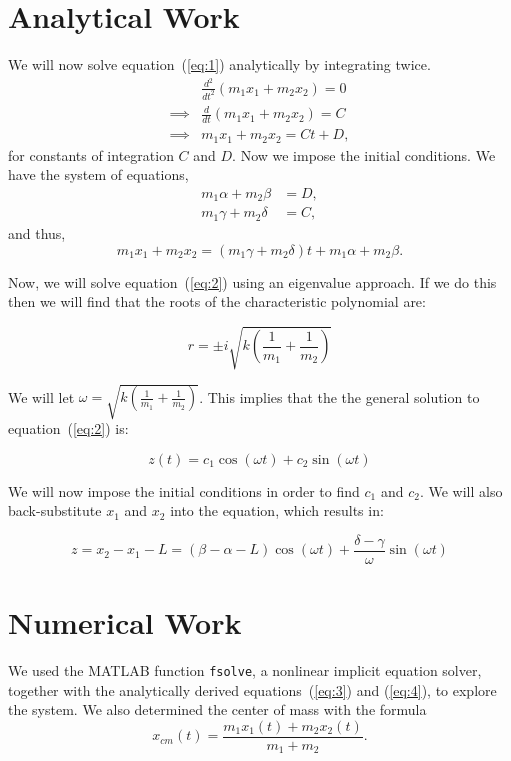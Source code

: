 \documentclass[11pt, oneside]{article}   	%
\begin{document}
\section{Analytical Work}
We will now solve equation~(\ref{eq:1})  analytically by integrating twice.
\begin{align*}
&\frac{d^2}{dt^2}(m_1x_1 + m_2x_2) = 0 \\
\implies & \frac{d}{dt}(m_1x_1 + m_2x_2) = C\\
\implies & m_1x_1 + m_2x_2 = Ct+D,
\end{align*}
for constants of integration $C$ and $D$. Now we impose the initial conditions.
We have the system of equations,
\begin{align*}
m_1\alpha + m_2\beta &= D, \\
m_1\gamma + m_2\delta &= C,
\end{align*}
and thus,
\begin{equation}
\label{eq:3}
m_1x_1 + m_2x_2 = (m_1\gamma + m_2\delta)t + m_1\alpha + m_2\beta.
\end{equation}

Now, we will solve equation~(\ref{eq:2}) using an eigenvalue approach.
If we do this then we will find that the roots of the characteristic polynomial are:

$$r = \pm i\sqrt{k\left(\frac{1}{m_1}+\frac{1}{m_2}\right)}$$

We will let $\displaystyle{\omega = \sqrt{k\left(\frac{1}{m_1}+\frac{1}{m_2}\right)}}$. This implies that the the general solution to equation~(\ref{eq:2}) is:

$$z(t) = c_1\cos{(\omega t)}+c_2\sin{(\omega t)}$$

We will now impose the initial conditions in order to find $c_1$ and $c_2$.
We will also back-substitute $x_1$ and $x_2$ into the equation, which results in:

\begin{equation}
\label{eq:4}
z = x_2-x_1-L = \left(\beta - \alpha - L\right)\cos{\left(\omega t\right)}+\frac{\delta - \gamma}{\omega}\sin{(\omega t)}
\end{equation}

\section{Numerical Work}
We used the MATLAB function \texttt{fsolve}, a nonlinear implicit equation solver, together with the analytically derived equations~(\ref{eq:3}) and (\ref{eq:4}), to explore the system.
We also determined the center of mass with the formula
$$
x_{cm}(t) = \frac{m_1x_1(t) + m_2x_2(t)}{m_1 + m_2}.
$$
\end{document}
